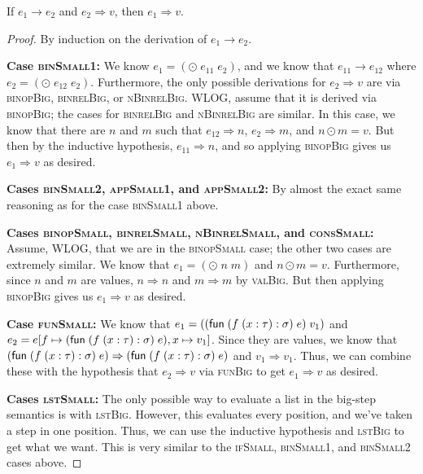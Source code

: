 \documentclass{homework}
\begin{document}
\begin{lem}
  If $e_1 \to e_2$ and $e_2 \Rightarrow v$, then $e_1 \Rightarrow v$.
  \label{lem:step_small_big}
\end{lem}
\begin{proof}
  By induction on the derivation of $e_1 \to e_2$.

  \vspace{0.5em}\noindent\textbf{Case \textsc{binSmall1}:}
  We know $e_1 = (\odot\; e_{11} \; e_2)$, and we know that $e_{11} \to e_{12}$ where $e_2 = (\odot\; e_{12} \; e_2)$.
  Furthermore, the only possible derivations for $e_2 \Rightarrow v$ are via \textsc{binopBig}, \textsc{binrelBig}, or \textsc{nBinrelBig}.
  WLOG, assume that it is derived via \textsc{binopBig}; the cases for \textsc{binrelBig} and \textsc{nBinrelBig} are similar.
  In this case, we know that there are $n$ and $m$ such that  $e_{12} \Rightarrow n$, $e_2 \Rightarrow m$, and $n \odot m = v$.
  But then by the inductive hypothesis, $e_{11} \Rightarrow n$, and so applying \textsc{binopBig} gives us $e_1 \Rightarrow v$ as desired.

  \vspace{0.5em}\noindent\textbf{Cases \textsc{binSmall2}, \textsc{appSmall1}, and \textsc{appSmall2}:}
  By almost the exact same reasoning as for the case \textsc{binSmall1} above.

  \vspace{0.5em}\noindent\textbf{Cases \textsc{binopSmall}, \textsc{binrelSmall}, \textsc{nBinrelSmall}, and \textsc{consSmall}:}
  Assume, WLOG, that we are in the \textsc{binopSmall} case; the other two cases are extremely similar.
  We know that $e_1= (\odot\; n\; m)$ and $n \odot m = v$.
  Furthermore, since $n$ and $m$ are values, $n \Rightarrow n$ and $m \Rightarrow m$ by \textsc{valBig}.
  But then applying \textsc{binopBig} gives us $e_1 \Rightarrow v$ as desired.
  
  \vspace{0.5em}\noindent\textbf{Case \textsc{funSmall}:}
  We know that $e_1 = ((\textsf{fun}\; (f\;(x : \tau) \mathrel{:} \sigma)\; e)\; v_1)$ and $e_2 = e[f \mapsto (\textsf{fun}\; (f\;(x : \tau) \mathrel{:} \sigma)\; e), x \mapsto v_1]$.
  Since they are values, we know that $(\textsf{fun}\; (f\;(x : \tau) \mathrel{:} \sigma)\; e) \Rightarrow (\textsf{fun}\; (f\;(x : \tau) \mathrel{:} \sigma)\; e)$ and $v_1 \Rightarrow v_1$.
  Thus, we can combine these with the hypothesis that $e_2 \Rightarrow v$ via \textsc{funBig} to get $e_1 \Rightarrow v$ as desired.  

  \vspace{0.5em}\noindent\textbf{Cases \textsc{lstSmall}:}
  The only possible way to evaluate a list in the big-step semantics is with \textsc{lstBig}.
  However, this evaluates every position, and we've taken a step in one position.
  Thus, we can use the inductive hypothesis and \textsc{lstBig} to get what we want.
  This is very similar to the \textsc{ifSmall}, \textsc{binSmall1}, and \textsc{binSmall2} cases above.
  

\end{proof}
\end{document}
